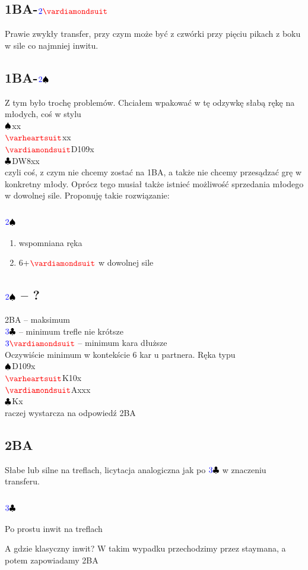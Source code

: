 \documentclass[11pt,a4paper,oneside]{report}
\newcommand*\Hs[1]{\ensuremath{{\color{blue} #1}{\color{red}\varheartsuit}}}
\newcommand*\Ss[1]{\ensuremath{{\color{blue} #1}{\color{black}\spadesuit}}}
\newcommand*\Ds[1]{\ensuremath{{\color{blue} #1}{\color{red}\vardiamondsuit}}}
\newcommand*\Cs[1]{\ensuremath{{\color{blue} #1}{\color{black}\clubsuit}}}
\newcommand{\tab}{\hspace*{15em}}
\newcommand*\Hand[4]{\\\tab\Ss{}#1\\\tab\Hs{}#2\\\tab\Ds{}#3\\\tab\Cs{}#4\\}
\begin{document}
\subsection*{1BA-\Ds{2}}
Prawie zwykły transfer, przy czym może być z czwórki przy pięciu pikach z boku w sile co najmniej inwitu.

\subsection*{1BA-\Ss{2}}
Z tym było trochę problemów. Chciałem wpakować w tę odzywkę słabą rękę na młodych, coś w stylu
\Hand{xx}{xx}{D109x}{DW8xx}
czyli coś, z czym nie chcemy zostać na 1BA, a także nie chcemy przesądzać grę w konkretny młody.
Oprócz tego musiał także istnieć możliwość sprzedania młodego w dowolnej sile. Proponuję takie
rozwiązanie:\\
\subsection*{\Ss{2}}
\begin{enumerate}
    \item wspomniana ręka
    \item 6+\Ds{} w dowolnej sile
\end{enumerate}
\subsection*{\Ss{2} -- ?}
2BA -- maksimum\\
\Cs{3} -- minimum trefle nie krótsze\\
\Ds{3} -- minimum kara dłuższe\\
\newpage
\noindent Oczywiście minimum w kontekście 6 kar u partnera. Ręka typu
\Hand{D109x}{K10x}{Axxx}{Kx}
raczej wystarcza na odpowiedź 2BA

\subsection*{2BA}
Słabe lub silne na treflach, licytacja analogiczna jak po \Cs{3} w znaczeniu transferu.

\subsection*{\Cs{3}}
Po prostu inwit na treflach

A gdzie klasyczny inwit? W takim wypadku przechodzimy przez staymana, a potem zapowiadamy 2BA
\end{document}
